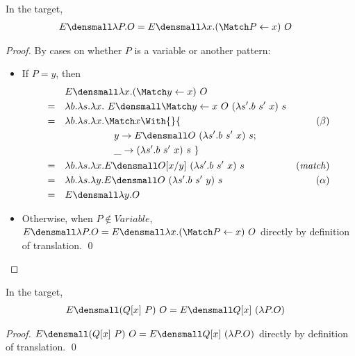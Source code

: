 \begin{lemma}
  \label{thm:pattern-lambda}
  In the target,
  \begin{align*}
    E\den{\lambda P. O} &= E\den{\lambda x. (\Match P \gets x) ~ O}
  \end{align*}
\end{lemma}
\begin{proof}
  By cases on whether $P$ is a variable or another pattern:
  \begin{itemize}
  \item If $P = y$, then
    \begin{align*}
      &\quad
      E\den{\lambda x. (\Match y \gets x) ~ O}
      \\
      =&\quad
      \lambda b. \lambda s. \lambda x.~
      E\den{\Match y \gets x ~ O} ~ (\lambda s'. b ~ s' ~ x) ~ s
      \\
      =&\quad
      \lambda b. \lambda s. \lambda x.
      \begin{aligned}[t]
        &\Match x \With{} \{~ \\
        &\quad y \to E\den{O} ~ (\lambda s'. b ~ s' ~ x) ~ s; \\
        &\quad \_ \to (\lambda s'. b ~ s' ~ x) ~ s
        ~\}
      \end{aligned}
      &(\beta)
      \\
      =&\quad
      \lambda b. \lambda s. \lambda x.
      E\den{O}\subst{y}{x} ~ (\lambda s'. b ~ s' ~ x) ~ s
      &(\mathit{match})
      \\
      =&\quad
      \lambda b. \lambda s. \lambda y.
      E\den{O} ~ (\lambda s'. b ~ s' ~ y) ~ s
      &(\alpha)
      \\
      =&\quad
      E\den{\lambda y. O}
    \end{align*}
  \item Otherwise, when $P \notin \mathit{Variable}$,
    \begin{math}
      E\den{\lambda P. O}
      =
      E\den{\lambda x. (\Match P \gets x) ~ O}
    \end{math}
    directly by definition of translation.
  \qed
  \end{itemize}
\end{proof}

\begin{lemma}
  \label{thm:copattern-abstraction}
  In the target,
  \begin{align*}
    E\den{(Q[x] ~ P) ~ O} &= E\den{Q[x] ~ (\lambda P. O)}
  \end{align*}
\end{lemma}
\begin{proof}
  \begin{math}
    E\den{(Q[x] ~ P) ~ O} = E\den{Q[x] ~ (\lambda P. O)}
  \end{math}
  directly by definition of translation.
  \qed
\end{proof}


